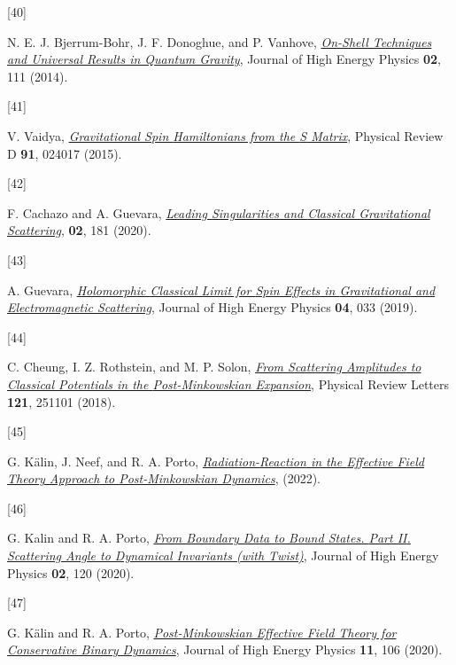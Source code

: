 \documentclass[
  10pt,
  a4paper,
  DIV=11,
  numbers=noendperiod,
  twoside]{scrreprt}
\newlength{\cslhangindent}
\newlength{\csllabelwidth}
\newlength{\cslentryspacingunit} %
\newenvironment{CSLReferences}[2] %
 {%
  \setlength{\parindent}{0pt}
  \ifodd #1
  \let\oldpar\par
  \def\par{\hangindent=\cslhangindent\oldpar}
  \fi
  \setlength{\parskip}{#2\cslentryspacingunit}
 }%
 {}
\newcommand{\CSLLeftMargin}[1]{\parbox[t]{\csllabelwidth}{#1}}
\newcommand{\CSLRightInline}[1]{\parbox[t]{\linewidth - \csllabelwidth}{#1}\break}
\DeclareRobustCommand{\[}{\begin{equation}}
\DeclareRobustCommand{\]}{\end{equation}}
\begin{document}
\begin{CSLReferences}{0}{0}
\leavevmode{}%
\CSLLeftMargin{{[}40{]} }%
\CSLRightInline{N. E. J. Bjerrum-Bohr, J. F. Donoghue, and P. Vanhove,
\emph{\href{https://doi.org/10.1007/JHEP02(2014)111}{On-Shell Techniques
and Universal Results in Quantum Gravity}}, Journal of High Energy
Physics \textbf{02}, 111 (2014).}

\leavevmode{}%
\CSLLeftMargin{{[}41{]} }%
\CSLRightInline{V. Vaidya,
\emph{\href{https://doi.org/10.1103/PhysRevD.91.024017}{Gravitational
Spin {Hamiltonians} from the {S} Matrix}}, Physical Review D
\textbf{91}, 024017 (2015).}

\leavevmode{}%
\CSLLeftMargin{{[}42{]} }%
\CSLRightInline{F. Cachazo and A. Guevara,
\emph{\href{https://doi.org/10.1007/JHEP02(2020)181}{Leading
{Singularities} and {Classical Gravitational Scattering}}}, \textbf{02},
181 (2020).}

\leavevmode{}%
\CSLLeftMargin{{[}43{]} }%
\CSLRightInline{A. Guevara,
\emph{\href{https://doi.org/10.1007/JHEP04(2019)033}{Holomorphic
{Classical Limit} for {Spin Effects} in {Gravitational} and
{Electromagnetic Scattering}}}, Journal of High Energy Physics
\textbf{04}, 033 (2019).}

\leavevmode{}%
\CSLLeftMargin{{[}44{]} }%
\CSLRightInline{C. Cheung, I. Z. Rothstein, and M. P. Solon,
\emph{\href{https://doi.org/10.1103/PhysRevLett.121.251101}{From
{Scattering Amplitudes} to {Classical Potentials} in the
{Post-Minkowskian Expansion}}}, Physical Review Letters \textbf{121},
251101 (2018).}

\leavevmode{}%
\CSLLeftMargin{{[}45{]} }%
\CSLRightInline{G. Kälin, J. Neef, and R. A. Porto,
\emph{\href{https://arxiv.org/abs/2207.00580}{Radiation-{Reaction} in
the {Effective Field Theory Approach} to {Post-Minkowskian Dynamics}}},
(2022).}

\leavevmode{}%
\CSLLeftMargin{{[}46{]} }%
\CSLRightInline{G. Kalin and R. A. Porto,
\emph{\href{https://doi.org/10.1007/JHEP02(2020)120}{From Boundary Data
to Bound States. {Part II}. {Scattering} Angle to Dynamical Invariants
(with Twist)}}, Journal of High Energy Physics \textbf{02}, 120 (2020).}

\leavevmode{}%
\CSLLeftMargin{{[}47{]} }%
\CSLRightInline{G. Kälin and R. A. Porto,
\emph{\href{https://doi.org/10.1007/JHEP11(2020)106}{Post-{Minkowskian
Effective Field Theory} for {Conservative Binary Dynamics}}}, Journal of
High Energy Physics \textbf{11}, 106 (2020).}


\end{CSLReferences}
\end{document}

